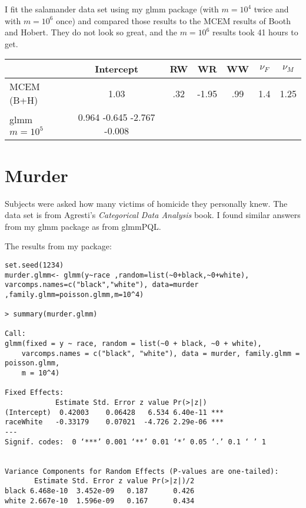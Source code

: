 \documentclass{article}
\begin{document}
I fit the salamander data set using  my glmm package (with $m=10^4$ twice and with $m=10^6$ once)  and compared those results to the MCEM results of Booth and Hobert. They do not look so great, and the $m=10^6$ results took 41 hours to get.

\begin{tabular}{lcccccc}
& Intercept & RW & WR & WW & $\nu_F$ & $\nu_M$ \\ \hline
MCEM (B+H) & 1.03 & .32 & -1.95 & .99 & 1.4 & 1.25 \\
glmm $m=10^5$ &   0.964      -0.645      -2.767      -0.008
\end{tabular}









\section{Murder}
Subjects were asked how many victims of homicide they personally knew. The data set is from Agresti's \textit{Categorical Data Analysis} book. I found similar answers from my glmm package as from glmmPQL.

The results from my package:

\begin{verbatim}
set.seed(1234)
murder.glmm<- glmm(y~race ,random=list(~0+black,~0+white), varcomps.names=c("black","white"), data=murder ,family.glmm=poisson.glmm,m=10^4)

> summary(murder.glmm)

Call:
glmm(fixed = y ~ race, random = list(~0 + black, ~0 + white), 
    varcomps.names = c("black", "white"), data = murder, family.glmm = poisson.glmm, 
    m = 10^4)

Fixed Effects:
            Estimate Std. Error z value Pr(>|z|)    
(Intercept)  0.42003    0.06428   6.534 6.40e-11 ***
raceWhite   -0.33179    0.07021  -4.726 2.29e-06 ***
---
Signif. codes:  0 ‘***’ 0.001 ‘**’ 0.01 ‘*’ 0.05 ‘.’ 0.1 ‘ ’ 1


Variance Components for Random Effects (P-values are one-tailed):
       Estimate Std. Error z value Pr(>|z|)/2
black 6.468e-10  3.452e-09   0.187      0.426
white 2.667e-10  1.596e-09   0.167      0.434
\end{verbatim}
\end{document}
